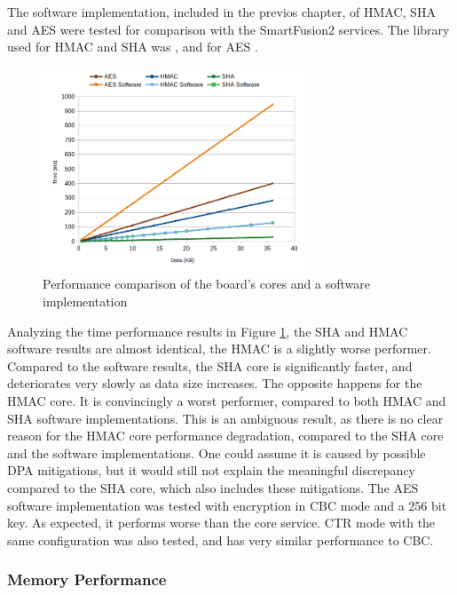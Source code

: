 The software implementation, included in the previos chapter, of HMAC, SHA and AES were tested for comparison with the SmartFusion2 services. The library used for HMAC and SHA was \cite{ogayHMAC}, and for AES \cite{tinycrypt}. 

\begin{figure}[h!]
	\centering
	\includegraphics[width=0.7\textwidth]{./Images/software-core-time.png}
	\caption{Performance comparison of the board's cores and a software implementation}
	\label{fig:performance:software-core-time}
\end{figure}

Analyzing the time performance results in Figure \ref{fig:performance:software-core-time}, the SHA and HMAC software results are almost identical, the HMAC is a slightly worse performer. Compared to the software results, the SHA core is significantly faster, and deteriorates very slowly as data size increases. The opposite happens for the HMAC core. It is convincingly a worst performer, compared to both HMAC and SHA software implementations. 
This is an ambiguous result, as there is no clear reason for the HMAC core performance degradation, compared to the SHA core and the software implementations. One could assume it is caused by possible DPA mitigations, but it would still not explain the meaningful discrepancy compared to the SHA core, which also includes these mitigations.
The AES software implementation was tested with encryption in CBC mode and a 256 bit key. As expected, it performs worse than the core service. CTR mode with the same configuration was also tested, and has very similar performance to CBC.

\subsubsection*{Memory Performance}\label{chap:evaluation:services:memory}


